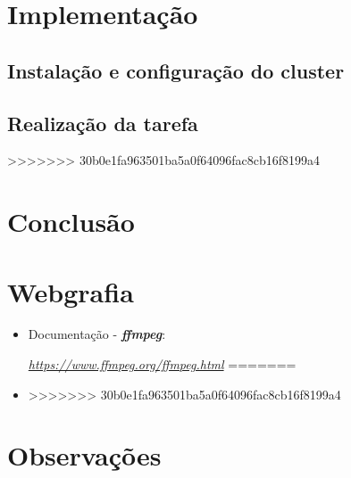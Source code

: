 \documentclass[a4paper]{report}
\begin{document}
\chapter{Implementação}

    \section{Instalação e configuração do cluster}
    
    \section{Realização da tarefa}
>>>>>>> 30b0e1fa963501ba5a0f64096fac8cb16f8199a4

\chapter{Conclusão}
\large{

}

\chapter{Webgrafia}
    \begin{itemize}
<<<<<<< HEAD
        \item Documentação - \textbf{\textit{ffmpeg}}:
        \par \textit{\url{https://www.ffmpeg.org/ffmpeg.html}}
=======
        \item 
>>>>>>> 30b0e1fa963501ba5a0f64096fac8cb16f8199a4
    \end{itemize}

\appendix
\chapter{Observações}
\end{document}
